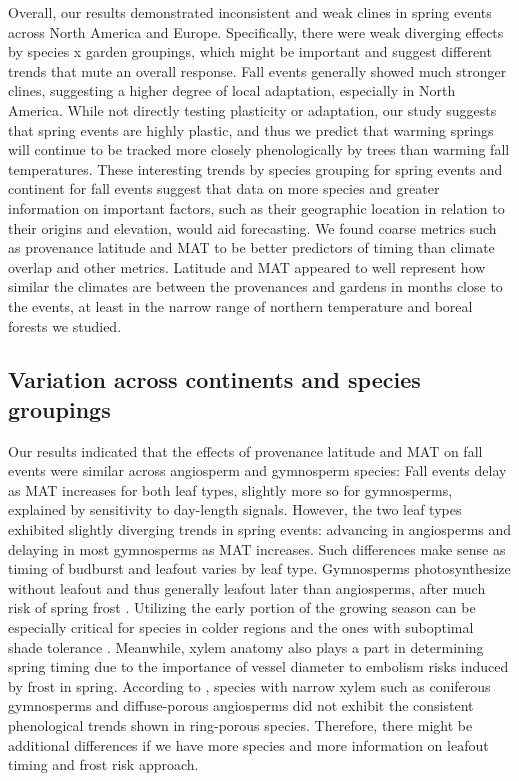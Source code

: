 \documentclass{article}
\begin{document}
Overall, our results demonstrated inconsistent and weak clines in spring events across North America and Europe. Specifically, there were weak diverging effects by species x garden groupings, which might be important and suggest different trends that mute an overall response. Fall events generally showed much stronger clines, suggesting a higher degree of local adaptation, especially in North America. While not directly testing plasticity or adaptation, our study suggests that spring events are highly plastic, and thus we predict that warming springs will continue to be tracked more closely phenologically by trees than warming fall temperatures. These interesting trends by species grouping for spring events and continent for fall events suggest that data on more species and greater information on important factors, such as their geographic location in relation to their origins and elevation, would aid forecasting. 
We found coarse metrics such as provenance latitude and MAT to be better predictors of timing than climate overlap and other metrics. Latitude and MAT appeared to well represent how similar the climates are between the provenances and gardens in months close to the events, at least in the narrow range of northern temperature and boreal forests we studied. 

\subsection{Variation across continents and species groupings}

Our results indicated that the effects of provenance latitude and MAT on fall events were similar across angiosperm and gymnosperm species: Fall events delay as MAT increases for both leaf types, slightly more so for gymnosperms, explained by sensitivity to day-length signals. However, the two leaf types exhibited slightly diverging trends in spring events:  advancing in angiosperms and delaying in most gymnosperms as MAT increases. Such differences make sense as timing of budburst and leafout varies by leaf type. Gymnosperms photosynthesize without leafout and thus generally leafout later than angiosperms, after much risk of spring frost \citep{panchen14}. Utilizing the early portion of the growing season can be especially critical for species in colder regions \citep{morin07, dantec15} and the ones with suboptimal shade tolerance \citep{richardson09}. 
Meanwhile, xylem anatomy also plays a part in determining spring timing due to the importance of vessel diameter to embolism risks induced by frost in spring. According to \citet{salk20}, species with narrow xylem such as coniferous gymnosperms and diffuse-porous angiosperms did not exhibit the consistent phenological trends shown in ring-porous species. Therefore, there might be additional differences if we have more species and more information on leafout timing and frost risk approach. 
\end{document}
